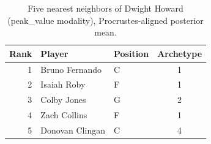 \begin{table}[htbp]
  \centering\small
  \begin{tabular}{rllc}
    \toprule
    Rank & Player & Position & Archetype \\
    \midrule
    1 & Bruno Fernando & C & 1 \\
    2 & Isaiah Roby & F & 1 \\
    3 & Colby Jones & G & 2 \\
    4 & Zach Collins & F & 1 \\
    5 & Donovan Clingan & C & 4 \\
    \bottomrule
  \end{tabular}
  \caption{Five nearest neighbors of Dwight Howard (peak_value modality), Procrustes-aligned posterior mean.}
  \label{tab:Dwight_Howard_neighbors_peak_value}
\end{table}

